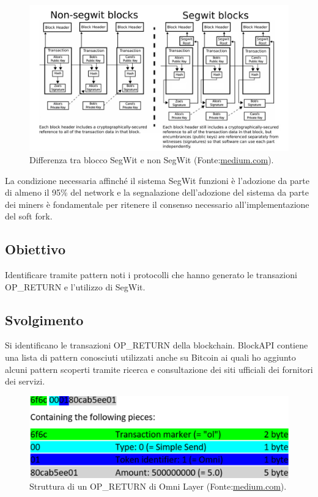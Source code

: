 \begin{figure}[h]
	\centering
	\includegraphics[width=1.0\linewidth]{images/segwitvsnonsegwit-medium}
	\caption{Differenza tra blocco SegWit e non SegWit (Fonte:\url{medium.com}).}
	\label{fig:segwitvsnonsegwit-medium}
\end{figure}


La condizione necessaria affinché il sistema SegWit funzioni è l’adozione da parte di almeno il 95\% del network e la segnalazione dell’adozione del sistema da parte dei miners è fondamentale per ritenere il consenso necessario all’implementazione del soft fork.


\subsection{Obiettivo}
Identificare tramite pattern noti i protocolli che hanno generato le transazioni OP\_RETURN e l'utilizzo di SegWit.
\subsection{Svolgimento}
Si identificano le transazioni OP\_RETURN della blockchain. BlockAPI contiene una lista di pattern conosciuti utilizzati anche su Bitcoin ai quali ho aggiunto alcuni pattern scoperti tramite ricerca e consultazione dei siti ufficiali dei fornitori dei servizi.

\begin{figure}[h]
	\begin{center}
		\includegraphics[width=1.0\linewidth]{images/ol-omnilayer-medium}
		\caption{Struttura di un OP\_RETURN di Omni Layer (Fonte:\url{medium.com}).}
		\label{fig:ol-omnilayer-medium}
	\end{center}
\end{figure}


